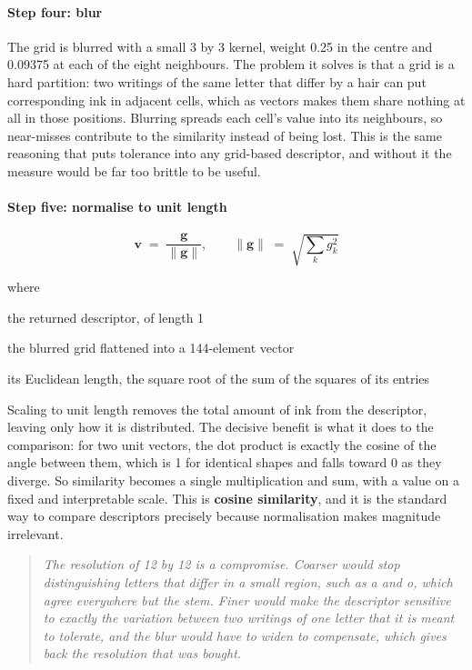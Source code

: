 \paragraph{Step four: blur}
The grid is blurred with a small 3 by 3 kernel, weight 0.25 in the centre and 0.09375 at each of the eight neighbours. The problem it solves is that a grid is a hard partition: two writings of the same letter that differ by a hair can put corresponding ink in adjacent cells, which as vectors makes them share nothing at all in those positions. Blurring spreads each cell's value into its neighbours, so near-misses contribute to the similarity instead of being lost. This is the same reasoning that puts tolerance into any grid-based descriptor, and without it the measure would be far too brittle to be useful.


\paragraph{Step five: normalise to unit length}

\begin{equation}
\mathbf{v} \;=\; \frac{\mathbf{g}}{\|\mathbf{g}\|}, \qquad \|\mathbf{g}\| \;=\; \sqrt{\textstyle\sum_{k} g_k^2}
\end{equation}

\noindent where
\begin{description}[leftmargin=2.4em,style=nextline,font=\normalfont\ttfamily]\setlength\itemsep{1pt}
  \item[{$\mathbf{v}$}] \normalfont the returned descriptor, of length 1
  \item[{$\mathbf{g}$}] \normalfont the blurred grid flattened into a 144-element vector
  \item[{$\|\mathbf{g}\|$}] \normalfont its Euclidean length, the square root of the sum of the squares of its entries
\end{description}
Scaling to unit length removes the total amount of ink from the descriptor, leaving only how it is distributed. The decisive benefit is what it does to the comparison: for two unit vectors, the dot product is exactly the cosine of the angle between them, which is 1 for identical shapes and falls toward 0 as they diverge. So similarity becomes a single multiplication and sum, with a value on a fixed and interpretable scale. This is \textbf{cosine similarity}, and it is the standard way to compare descriptors precisely because normalisation makes magnitude irrelevant.


\begin{quote}\small\itshape The resolution of 12 by 12 is a compromise. Coarser would stop distinguishing letters that differ in a small region, such as a and o, which agree everywhere but the stem. Finer would make the descriptor sensitive to exactly the variation between two writings of one letter that it is meant to tolerate, and the blur would have to widen to compensate, which gives back the resolution that was bought.\end{quote}

